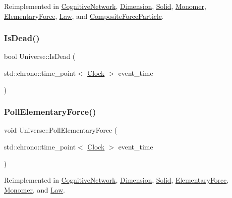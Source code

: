 Reimplemented in \mbox{\hyperlink{classCognitiveNetwork_aa6342c390fe8e7c648b4c6bc8f93ba4a}{Cognitive\+Network}}, \mbox{\hyperlink{classDimension_a5bb5a164564013a60728854cc2e5ddb3}{Dimension}}, \mbox{\hyperlink{classSolid_ac98f9c827d58a631627423e25dd611ba}{Solid}}, \mbox{\hyperlink{classMonomer_aec6e42dde40c5b3142fab880eabb346a}{Monomer}}, \mbox{\hyperlink{classElementaryForce_a928e06a1fa81b8d7ec4a426d959a0f98}{Elementary\+Force}}, \mbox{\hyperlink{classLaw_aad6e54da64a5d8499dcb6c232aa6748f}{Law}}, and \mbox{\hyperlink{classCompositeForceParticle_a27762218af4e3c021c89ff4792d81b41}{Composite\+Force\+Particle}}.

\mbox{\label{classUniverse_a8fdaa6d06584e1ef50c4c613b22b786e}} 
\subsubsection{\texorpdfstring{Is\+Dead()}{IsDead()}}
{\footnotesize\ttfamily bool Universe\+::\+Is\+Dead (\begin{DoxyParamCaption}\item[{std\+::chrono\+::time\+\_\+point$<$ \mbox{\hyperlink{universe_8h_a0ef8d951d1ca5ab3cfaf7ab4c7a6fd80}{Clock}} $>$}]{event\+\_\+time }\end{DoxyParamCaption})}

\mbox{\label{classUniverse_a0c485c504542409cbb5cfd8543c35b11}} 
\subsubsection{\texorpdfstring{Poll\+Elementary\+Force()}{PollElementaryForce()}}
{\footnotesize\ttfamily void Universe\+::\+Poll\+Elementary\+Force (\begin{DoxyParamCaption}\item[{std\+::chrono\+::time\+\_\+point$<$ \mbox{\hyperlink{universe_8h_a0ef8d951d1ca5ab3cfaf7ab4c7a6fd80}{Clock}} $>$}]{event\+\_\+time }\end{DoxyParamCaption})\hspace{0.3cm}{\ttfamily [virtual]}}



Reimplemented in \mbox{\hyperlink{classCognitiveNetwork_ac97c08a0af7dc0d02fbe059827b6be87}{Cognitive\+Network}}, \mbox{\hyperlink{classDimension_a5b07f5c8558233c8f3488baf1fe3459a}{Dimension}}, \mbox{\hyperlink{classSolid_ae2a486e59f11f96a1a39756b3f3da53f}{Solid}}, \mbox{\hyperlink{classElementaryForce_aa5ab479744dbf3e8578f8d2974299ff7}{Elementary\+Force}}, \mbox{\hyperlink{classMonomer_a5b2375df1e19abdf6045c475d2ac23ca}{Monomer}}, and \mbox{\hyperlink{classLaw_af99520c95b2cd8af0af110b78b2288ef}{Law}}.

